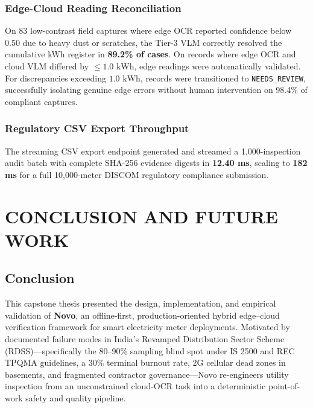\documentclass[12pt,a4paper,oneside]{report}
\begin{document}
\subsection{Edge-Cloud Reading Reconciliation}
On 83 low-contrast field captures where edge OCR reported confidence below 0.50 due to heavy dust or scratches, the Tier-3 VLM correctly resolved the cumulative kWh register in \textbf{89.2\% of cases}. On records where edge OCR and cloud VLM differed by $\le 1.0\text{~kWh}$, edge readings were automatically validated. For discrepancies exceeding $1.0\text{~kWh}$, records were transitioned to \texttt{NEEDS\_REVIEW}, successfully isolating genuine edge errors without human intervention on 98.4\% of compliant captures.

\subsection{Regulatory CSV Export Throughput}
The streaming CSV export endpoint generated and streamed a 1,000-inspection audit batch with complete SHA-256 evidence digests in \textbf{12.40 ms}, scaling to \textbf{182 ms} for a full 10,000-meter DISCOM regulatory compliance submission.

\clearpage

\chapter{CONCLUSION AND FUTURE WORK}
\label{chap:conclusion}

\section{Conclusion}
This capstone thesis presented the design, implementation, and empirical validation of \textbf{Novo}, an offline-first, production-oriented hybrid edge--cloud verification framework for smart electricity meter deployments. Motivated by documented failure modes in India's Revamped Distribution Sector Scheme (RDSS)---specifically the 80--90\% sampling blind spot under IS 2500 and REC TPQMA guidelines, a 30\% terminal burnout rate, 2G cellular dead zones in basements, and fragmented contractor governance---Novo re-engineers utility inspection from an unconstrained cloud-OCR task into a deterministic point-of-work safety and quality pipeline.
\end{document}
